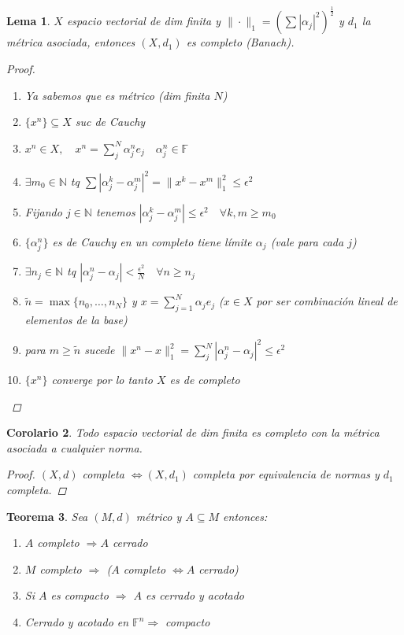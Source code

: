 \documentclass[12pt,a4paper]{article}
\newtheorem{theorem}{Teorema}[section]
\newtheorem{lemma}[theorem]{Lema}
\newtheorem{corollary}[theorem]{Corolario}
\theoremstyle{definition}
\theoremstyle{remark}
\begin{document}
\begin{lemma}
$X$ espacio vectorial de dim finita y $\|\cdot\|_1 =\left(\sum |\alpha_j|^2\right)^{\frac{1}{2}}$ y $d_1$ la métrica asociada, entonces $(X,d_1)$ es completo (Banach).
\begin{proof}
\begin{enumerate}
    \item Ya sabemos que es métrico (dim finita $N$)
    \item $\{x^n\}\subseteq X$ suc de Cauchy
    \item $x^n\in X,\quad x^n=\sum_{j}^{N}\alpha_j^n e_j\quad \alpha_j^n\in \mathbb{F}$
    \item $\exists m_0\in \mathbb{N}$ tq $\sum |\alpha_j^k-\alpha_j^m|^2=\|x^k-x^m\|_1^2\leq \epsilon^2$
    \item Fijando $j\in \mathbb{N}$ tenemos $|\alpha_j^k-\alpha_j^m|\leq\epsilon^2\quad \forall k,m\geq m_0$
    \item $\{\alpha_j^n\}$ es de Cauchy en un completo tiene límite $\alpha_j$ (vale para cada $j$)
    \item $\exists n_j\in \mathbb{N}$ tq $|\alpha_j^n -\alpha_j| < \frac{\epsilon^2}{N} \quad\forall n\geq n_j$
    \item $\tilde{n}=\max\{n_0,\dots,n_N\}$ y $x=\sum^N_{j=1}\alpha_j e_j$ ($x\in X$ por ser combinación lineal de elementos de la base)
    \item para $m\geq \tilde{n}$ sucede $\|x^n-x\|_1^2=\sum_j^N|\alpha_j^n-\alpha_j|^2\leq \epsilon^2$
    \item $\{x^n\}$ converge por lo tanto $X$ es de completo
\end{enumerate}
\end{proof}
\end{lemma}

\begin{corollary}
Todo espacio vectorial de dim finita es completo con la métrica asociada a cualquier norma.
\begin{proof}
$(X,d)$ completa $\iff(X,d_1)$ completa por equivalencia de normas y $d_1$ completa.
\end{proof}
\end{corollary}

\begin{theorem}
Sea $(M,d)$ métrico y $A\subseteq M$ entonces:
\begin{enumerate}
    \item $A$ completo $\Rightarrow A$ cerrado
    \item $M$ completo $\Rightarrow$ ($A$ completo $\iff A$ cerrado)
    \item Si $A$ es compacto $\Rightarrow$ $A$ es cerrado y acotado
    \item Cerrado y acotado en $\mathbb{F}^n \Rightarrow$ compacto
\end{enumerate}
\end{theorem}
\end{document}
